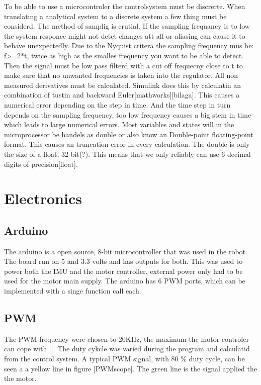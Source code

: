 \documentclass[a4paper,11pt]{kth-mag}
\begin{document}
To be able to use a microcontroler the controlsystem must be discrerte. When translating a analytical system to a 
discrete system a few thing must be considerd. The method of samplig is crutial. If the sampling frequancy is to 
low the system responce might not detct changes att all or aliasing can cause it to behave unexpectedly. Due to the 
Nyquist critera the sampling frequency mus be: f>=2*t, twice as high as the smalles frequency you want to be able to
detect. Then the signal must be low pass filterd with a cut off frequecny close to t to make sure that no unwanted
frequencies is taken into the regulator.
All non measured derivatives must be calculated. Simulink does this by calculatin an combination of tustin and 
backward Euler[mathworks][bilaga]. This causes a numerical error depending on the step in time. And the time step
in turn depends on the sampling frequency, too low frequency causes a big stem in time which leads to large numerical 
errors.
Most variables and states will in the microprocessor be handels as double or also know an Double-point floating-point
format. This causes an truncation error in every calculation. The double is only the size of a float, 32-bit(?). This
means that we only reliably can use 6 decimal digits of precision[float].

\section{Electronics}

\subsection{Arduino}
The arduino is a open source, 8-bit microcontroller that was used in the robot. 
The board run on 5 and 3.3 volts and has outputs for both. This was used to power both the IMU and the motor controller, external power only had to be used for the motor main supply. 
The arduino has 6 PWM ports, which can be implemented with a singe function call each.

\subsection{PWM}
The PWM frequency were chosen to 20KHz, the maximum the motor controler can cope with []. The duty cykcle was varied during the program and calculatid from the control system. A typical PWM signal, with 80 \%  duty cycle, can be seen a a yellow line in figure [PWMscope]. The green line is the signal applied the the motor.
\end{document}
